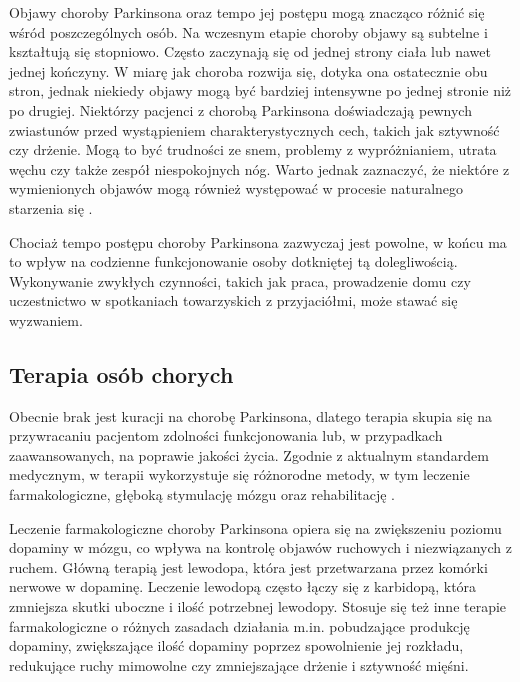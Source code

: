 Objawy choroby Parkinsona oraz tempo jej postępu mogą znacząco różnić się wśród poszczególnych osób.
Na wczesnym etapie choroby objawy są subtelne i kształtują się stopniowo.
Często zaczynają się od jednej strony ciała lub nawet jednej kończyny.
W miarę jak choroba rozwija się, dotyka ona ostatecznie obu stron, jednak niekiedy objawy mogą być bardziej intensywne po jednej stronie niż po drugiej.
Niektórzy pacjenci z chorobą Parkinsona doświadczają pewnych zwiastunów przed wystąpieniem charakterystycznych cech, takich jak sztywność czy drżenie.
Mogą to być trudności ze snem, problemy z wypróżnianiem, utrata węchu czy także zespół niespokojnych nóg.
Warto jednak zaznaczyć, że niektóre z wymienionych objawów mogą również występować w procesie naturalnego starzenia się \cite{National_Institute_on_Aging_2022}.


Chociaż tempo postępu choroby Parkinsona zazwyczaj jest powolne, w końcu ma to wpływ na codzienne funkcjonowanie osoby dotkniętej tą dolegliwością.
Wykonywanie zwykłych czynności, takich jak praca, prowadzenie domu czy uczestnictwo w spotkaniach towarzyskich z przyjaciółmi, może stawać się wyzwaniem.


\subsection{Terapia osób chorych}
\label{subsec:terapia}
Obecnie brak jest kuracji na chorobę Parkinsona, dlatego terapia skupia się na przywracaniu pacjentom zdolności funkcjonowania
lub, w przypadkach zaawansowanych, na poprawie jakości życia.
Zgodnie z aktualnym standardem medycznym, w terapii wykorzystuje się różnorodne metody, w tym leczenie farmakologiczne, głęboką stymulację mózgu oraz rehabilitację \cite{National_Institute_on_Aging_2022}.

Leczenie farmakologiczne choroby Parkinsona opiera się na zwiększeniu poziomu dopaminy w mózgu, co wpływa na kontrolę objawów
ruchowych i niezwiązanych z ruchem. Główną terapią jest lewodopa, która jest przetwarzana przez komórki nerwowe w dopaminę.
Leczenie lewodopą często łączy się z karbidopą, która zmniejsza skutki uboczne i ilość potrzebnej lewodopy.
Stosuje się też inne terapie farmakologiczne o różnych zasadach działania m.in. pobudzające produkcję dopaminy,
zwiększające ilość dopaminy poprzez spowolnienie jej rozkładu, redukujące ruchy mimowolne czy zmniejszające drżenie i sztywność mięśni.

